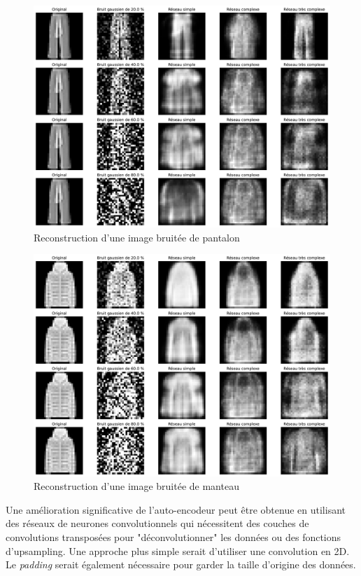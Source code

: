 \documentclass{article}
\begin{document}
\begin{figure}[htbp]
    \centering
    \includegraphics*[width=\textwidth]{reconstruct_noisy_pantalon.pdf}
    \caption{Reconstruction d'une image bruitée de pantalon}
    \label{fig:reconstructnoisypantalon}
\end{figure}


\begin{figure}[htbp]
    \centering
    \includegraphics*[width=\textwidth]{reconstruct_noisy_coat.pdf}
    \caption{Reconstruction d'une image bruitée de manteau}
    \label{fig:reconstructnoisycoat}
\end{figure}

Une amélioration significative de l'auto-encodeur peut être obtenue en utilisant des réseaux de neurones convolutionnels qui nécessitent des couches de convolutions transposées pour "déconvolutionner" les données ou des fonctions d'upsampling. 
Une approche plus simple serait d'utiliser une convolution en 2D. Le \textit{padding} serait également nécessaire pour garder la taille d'origine des données.
\end{document}
